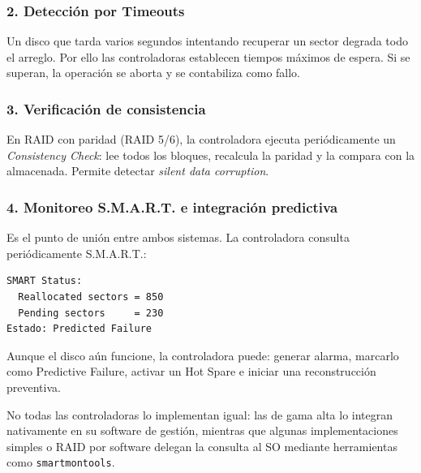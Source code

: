 \subsubsection{2. Detección por Timeouts}
Un disco que tarda varios segundos intentando recuperar un sector degrada todo el arreglo. Por ello las controladoras establecen tiempos máximos de espera. Si se superan, la operación se aborta y se contabiliza como fallo.

\subsubsection{3. Verificación de consistencia}
En RAID con paridad (RAID 5/6), la controladora ejecuta periódicamente un \textit{Consistency Check}: lee todos los bloques, recalcula la paridad y la compara con la almacenada. Permite detectar \textit{silent data corruption}.

\subsubsection{4. Monitoreo S.M.A.R.T. e integración predictiva}

Es el punto de unión entre ambos sistemas. La controladora consulta periódicamente S.M.A.R.T.:
\begin{verbatim}
SMART Status:
  Reallocated sectors = 850
  Pending sectors     = 230
Estado: Predicted Failure
\end{verbatim}
Aunque el disco aún funcione, la controladora puede: generar alarma, marcarlo como Predictive Failure, activar un Hot Spare e iniciar una reconstrucción preventiva.

No todas las controladoras lo implementan igual: las de gama alta lo integran nativamente en su software de gestión, mientras que algunas implementaciones simples o RAID por software delegan la consulta al SO mediante herramientas como \texttt{smartmontools}.
